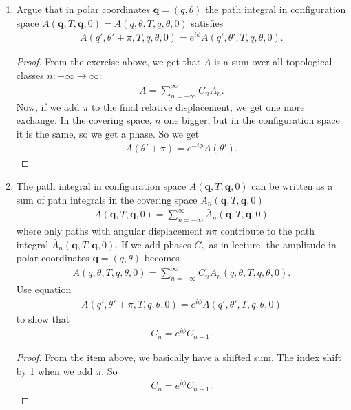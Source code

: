 \documentclass{book}
\theoremstyle{definition}
\begin{document}
\begin{enumerate}
	
	
	\item Argue that in polar coordinates $\bm{q} = (q,\theta)$ the path integral in configuration space $A(\bm{q}, T, \bm q, 0) = A(q,\theta,T,q,\theta,0)$ satisfies
	\begin{align}
	A(q',\theta'+\pi , T, q,\theta,0) = e^{i\phi} A(q',\theta', T, q, \theta,0).
	\end{align}
	
	\begin{proof}
		From the exercise above, we get that $A$ is a sum over all topological classes $n: -\infty \to \infty$:
		\begin{align}
		A = \sum_{n=-\infty}^{\infty} C_n \bar{A}_n.
		\end{align} 
		Now, if we add $\pi$ to the final relative displacement, we get one more exchange. In the covering space, $n$ one bigger, but in the configuration space it is the same, so we get a phase. So we get
		\begin{align}
		A(\theta'+\pi) = e^{-i\phi} A(\theta').
		\end{align}
	\end{proof}
	
	
	
	\item The path integral in configuration space $A(\bm q, T , \bm q,0)$ can be written as a sum of path integrals in the covering space $\bar{A}_n(\bm q, T ,\bm q ,0)$
	\begin{align}
	A(\bm q, T, \bm q, 0) = \sum^{\infty}_{n=-\infty} \bar{A}_n (\bm q , T , \bm q,0)
	\end{align}
	where only paths with angular displacement $n\pi$ contribute to the path integral $\bar{A}_n(\bm q, T, \bm q, 0)$. If we add phases $C_n$ as in lecture, the amplitude in polar coordinates $\bm q = (q,\theta)$ becomes
	\begin{align}
	A(q,\theta, T,q,\theta,0) = \sum^{\infty}_{n=-\infty} C_n \bar{A}_n(q,\theta,T,q,\theta,0).
	\end{align}
	Use equation 
	\begin{align}
	A(q',\theta'+\pi , T, q,\theta,0) = e^{i\phi} A(q',\theta', T, q, \theta,0)
	\end{align}
	to show that
	\begin{align}
	C_n = e^{i\phi}C_{n-1}.
	\end{align}
	 
	
	\begin{proof}
		From the item above, we basically have a shifted sum. The index shift by 1 when we add $\pi$. So
		\begin{align}
		C_n = e^{i\phi}C_{n-1}.
		\end{align}
		

\end{proof}
\end{enumerate}
\end{document}
